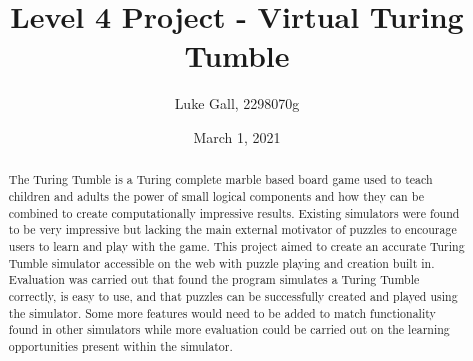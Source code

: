 \documentclass{l4proj}
\begin{document}
\title{Level 4 Project - Virtual Turing Tumble}
\author{Luke Gall, 2298070g}
\date{March 1, 2021}

\maketitle

\begin{abstract}
    The Turing Tumble is a Turing complete marble based board game used to teach children and adults the power of small logical components and how they can be combined to create computationally impressive results. Existing simulators were found to be very impressive but lacking the main external motivator of puzzles to encourage users to learn and play with the game. This project aimed to create an accurate Turing Tumble simulator accessible on the web with puzzle playing and creation built in. Evaluation was carried out that found the program simulates a Turing Tumble correctly, is easy to use, and that puzzles can be successfully created and played using the simulator. Some more features would need to be added to match functionality found in other simulators while more evaluation could be carried out on the learning opportunities present within the simulator.
\end{abstract}


%
%
\def\consentname {Luke Gall} %
\def\consentdate {12 February 2021} %
%
\educationalconsent


\tableofcontents
\end{document}
